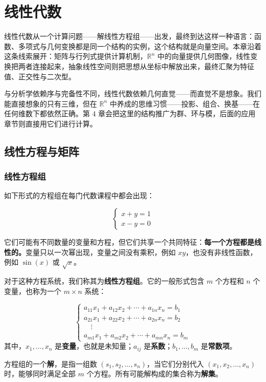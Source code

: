 \chapter{线性代数}

线性代数从一个计算问题——解线性方程组——出发，最终到达这样一种语言：函数、多项式与几何变换都是同一个结构的实例，这个结构就是向量空间。本章沿着这条线索展开：矩阵与行列式提供计算机制，$\mathbb{R}^n$ 中的向量提供几何图像，线性变换把两者连接起来，抽象线性空间则把思想从坐标中解放出来，最终汇聚为特征值、正交性与二次型。

与分析学依赖序与完备性不同，线性代数依赖几何直觉——而直觉不是想象。我们能直接想象的只有三维，但在 $\mathbb{R}^n$ 中养成的思维习惯——投影、组合、换基——在任何维数下都依然正确。第 4 章会把这里的结构推广为群、环与模，后面的应用章节则直接用它们进行计算。

\section{线性方程与矩阵}

\subsection{线性方程组}

如下形式的方程组在每门代数课程中都会出现：

\[
\begin{cases}
x+y=1\\
x-y =0
\end{cases}
\]

它们可能有不同数量的变量和方程，但它们共享一个共同特征：\textbf{每一个方程都是线性的。}变量只以一次幂出现，变量之间没有乘积，例如 $xy$，也没有非线性函数，例如 $\sin(x)$ 或 $\sqrt{x}$。

对于这种方程系统，我们称其为\textbf{线性方程组}。它的一般形式包含 $m$ 个方程和 $n$ 个变量，也称为一个 $m \times n$ 系统：

\[
\begin{cases}
a_{11}x_1 + a_{12}x_2 + \cdots + a_{1n}x_n = b_1\\
a_{21}x_1 + a_{22}x_2 + \cdots + a_{2n}x_n = b_2\\
\quad \vdots \\
a_{m1}x_1 + a_{m2}x_2 + \cdots + a_{mn}x_n = b_m
\end{cases}
\]
其中，$x_1,\ldots,x_n$ 是\textbf{变量}，也就是未知量；$a_{ij}$ 是\textbf{系数}；$b_1,\ldots,b_m$ 是\textbf{常数项}。

方程组的一个\textbf{解}，是指一组数 $(s_1,s_2,\ldots,s_n)$，当它们分别代入 $(x_1,x_2,\ldots,x_n)$ 时，能够同时满足全部 $m$ 个方程。所有可能解构成的集合称为\textbf{解集}。

